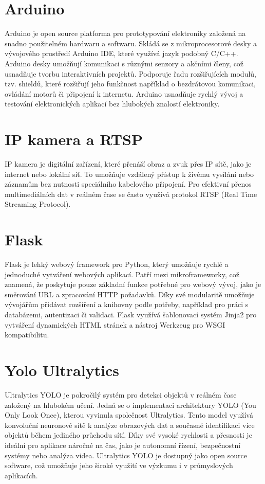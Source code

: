 \section{Arduino}\label{sec:arduino}
Arduino je open source platforma pro prototypování elektroniky založená na snadno použitelném hardwaru a softwaru.
Skládá se z mikroprocesorové desky a vývojového prostředí Arduino IDE, které využívá jazyk podobný C/C++.
Arduino desky umožňují komunikaci s různými senzory a akčními členy, což usnadňuje tvorbu interaktivních projektů.
Podporuje řadu rozšiřujících modulů, tzv. shieldů, které rozšiřují jeho funkčnost například o bezdrátovou komunikaci, ovládání motorů či připojení k internetu.
Arduino usnadňuje rychlý vývoj a testování elektronických aplikací bez hlubokých znalostí elektroniky.

\section{IP kamera a RTSP}\label{sec:ipcamera-rtsp}
IP kamera je digitální zařízení, které přenáší obraz a zvuk přes IP sítě, jako je internet nebo lokální síť.
To umožňuje vzdálený přístup k živému vysílání nebo záznamům bez nutnosti speciálního kabelového připojení.
Pro efektivní přenos multimediálních dat v reálném čase se často využívá protokol RTSP (Real Time Streaming Protocol).

\section{Flask}\label{sec:flask}
Flask je lehký webový framework pro Python, který umožňuje rychlé a jednoduché vytváření webových aplikací.
Patří mezi mikroframeworky, což znamená, že poskytuje pouze základní funkce potřebné pro webový vývoj, jako je směrování URL a zpracování HTTP požadavků.
Díky své modularitě umožňuje vývojářům přidávat rozšíření a knihovny podle potřeby, například pro práci s databázemi, autentizaci či validaci.
Flask využívá šablonovací systém Jinja2 pro vytváření dynamických HTML stránek a nástroj Werkzeug pro WSGI kompatibilitu.

\section{Yolo Ultralytics}\label{sec:yolo-ultralytics}
Ultralytics YOLO je pokročilý systém pro detekci objektů v reálném čase založený na hlubokém učení. Jedná se o implementaci architektury YOLO (You Only Look Once), kterou vyvinula společnost Ultralytics. Tento model využívá konvoluční neuronové sítě k analýze obrazových dat a současné identifikaci více objektů během jediného průchodu sítí. Díky své vysoké rychlosti a přesnosti je ideální pro aplikace náročné na čas, jako je autonomní řízení, bezpečnostní systémy nebo analýza videa. Ultralytics YOLO je dostupný jako open source software, což umožňuje jeho široké využití ve výzkumu i v průmyslových aplikacích.

